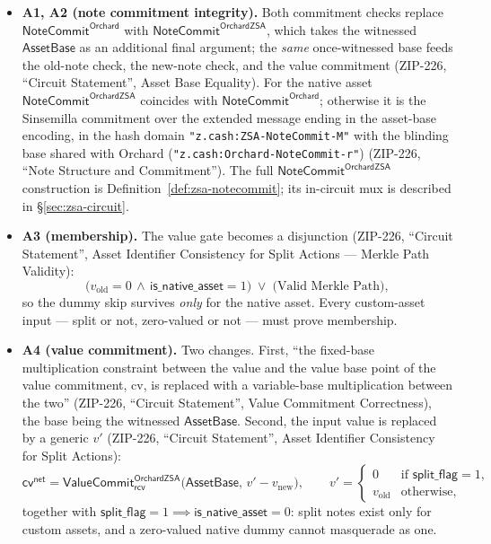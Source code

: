 \documentclass[11pt,a4paper]{article}
\theoremstyle{definition}
\newcommand{\cvsym}{\mathsf{cv}}
\newcommand{\NoteCommit}{\ensuremath{\mathsf{NoteCommit}}}
\newcommand{\rcv}{\ensuremath{\mathsf{rcv}}}
\begin{document}
\begin{itemize}[leftmargin=*]
\item \textbf{A1, A2 (note commitment integrity).} Both commitment checks
replace $\NoteCommit^{\mathsf{Orchard}}$ with
$\NoteCommit^{\mathsf{OrchardZSA}}$, which takes the witnessed
$\mathsf{AssetBase}$ as an additional final argument; the \emph{same}
once-witnessed base feeds the old-note check, the new-note check, and the
value commitment (ZIP-226, ``Circuit Statement'', Asset Base Equality).
For the native asset $\NoteCommit^{\mathsf{OrchardZSA}}$ coincides with
$\NoteCommit^{\mathsf{Orchard}}$; otherwise it is the Sinsemilla
commitment over the extended message ending in the asset-base encoding, in
the hash domain \texttt{"z.cash:ZSA-NoteCommit-M"} with the blinding base
shared with Orchard (\texttt{"z.cash:Orchard-NoteCommit-r"}) (ZIP-226,
``Note Structure and Commitment''). The full
$\NoteCommit^{\mathsf{OrchardZSA}}$ construction is
Definition~\ref{def:zsa-notecommit}; its in-circuit mux is described in
\S\ref{sec:zsa-circuit}.

\item \textbf{A3 (membership).} The value gate becomes a disjunction
(ZIP-226, ``Circuit Statement'', Asset Identifier Consistency for Split
Actions --- Merkle Path Validity):
\[
\bigl(v_{\mathrm{old}} = 0 \,\land\, \mathsf{is\_native\_asset} = 1\bigr)
\;\lor\; \bigl(\text{Valid Merkle Path}\bigr),
\]
so the dummy skip survives \emph{only} for the native asset. Every
custom-asset input --- split or not, zero-valued or not --- must prove
membership.

\item \textbf{A4 (value commitment).} Two changes. First, ``the
fixed-base multiplication constraint between the value and the value base
point of the value commitment, cv, is replaced with a variable-base
multiplication between the two'' (ZIP-226, ``Circuit Statement'', Value
Commitment Correctness), the base being the witnessed
$\mathsf{AssetBase}$. Second, the input value is replaced by a generic
$v'$ (ZIP-226, ``Circuit Statement'', Asset Identifier Consistency for
Split Actions):
\[
\cvsym^{\mathsf{net}} =
\mathsf{ValueCommit}^{\mathsf{OrchardZSA}}_{\rcv}\!\bigl(
\mathsf{AssetBase},\, v' - v_{\mathrm{new}}\bigr), \qquad
v' = \begin{cases} 0 & \text{if } \mathsf{split\_flag} = 1,\\
v_{\mathrm{old}} & \text{otherwise,}\end{cases}
\]
together with
$\mathsf{split\_flag} = 1 \implies \mathsf{is\_native\_asset} = 0$: split
notes exist only for custom assets, and a zero-valued native dummy cannot
masquerade as one.


\end{itemize}
\end{document}

